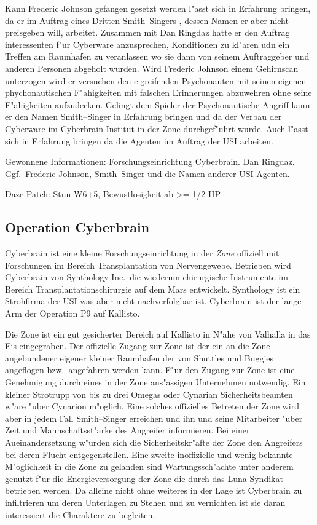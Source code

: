 Kann Frederic Johnson gefangen gesetzt werden l"asst sich in Erfahrung bringen, da\3 er im Auftrag eines Dritten Smith--Singers , dessen Namen er aber nicht preisgeben will, arbeitet. Zusammen mit Dan Ringdaz hatte er den Auftrag interessenten f"ur Cyberware anzusprechen, Konditionen zu kl"aren udn ein Treffen am Raumhafen zu veranlassen wo sie dann von seinem Auftraggeber und anderen Personen abgeholt wurden.
Wird Frederic Johnson einem Gehirnscan unterzogen wird er versuchen den eigreifenden Psychonauten mit seinen eigenen phychonautischen F"ahigkeiten mit falschen Erinnerungen abzuwehren ohne seine F"ahigkeiten aufzudecken. Gelingt dem Spieler der Psychonautische Angriff kann er den Namen Smith--Singer in Erfahrung bringen und da\3 der Verbau der Cyberware im Cyberbrain Institut in der Zone durchgef"uhrt wurde. Auch l"asst sich in Erfahrung bringen da\3 die Agenten im Auftrag der USI arbeiten.

\begin{remarks}
	Gewonnene Informationen: Forschungseinrichtung Cyberbrain. Dan Ringdaz. Ggf.~Frederic Johnson, Smith--Singer und die Namen anderer USI Agenten.

	Daze Patch: Stun W6+5, Bewustlosigkeit ab >= 1/2 HP
\end{remarks}


\subsection{Operation Cyberbrain}

Cyberbrain ist eine kleine Forschungseinrichtung in der \emph{Zone} offiziell mit Forschungen im Bereich Transplantation von Nervengewebe. Betrieben wird Cyberbrain von Synthology Inc.~die wiederum chirurgische Instrumente im Bereich Transplantationschirurgie auf dem Mars entwickelt. Synthology ist ein Strohfirma der USI was aber nicht nachverfolgbar ist. Cyberbrain ist der lange Arm der Operation P9 auf Kallisto.

Die Zone ist ein gut gesicherter Bereich auf Kallisto in N"ahe von Valhalla in das Eis eingegraben. Der offizielle Zugang zur Zone ist der ein an die Zone angebundener eigener kleiner Raumhafen der von Shuttles und Buggies angeflogen bzw.~angefahren werden kann. F"ur den Zugang zur Zone ist eine Genehmigung durch eines in der Zone ans"assigen Unternehmen notwendig. Ein kleiner Stro\3trupp von bis zu drei Omegas oder Cynarian Sicherheitsbeamten w"are "uber Cynarion m"oglich. Eine solches offizielles Betreten der Zone wird aber in jedem Fall  Smith--Singer erreichen und ihn und seine Mitarbeiter "uber Zeit und Mannschaftsst"arke des Angreifer informieren. Bei einer Au\3einandersetzung w"urden sich die Sicherheitskr"afte der Zone den Angreifers bei deren Flucht entgegenstellen. Eine zweite inoffizielle und wenig bekannte M"oglichkeit in die Zone zu gelanden sind Wartungssch"achte unter anderem genutzt f"ur die Energieversorgung der Zone die durch das Luna Syndikat betrieben werden. Da \xl{} alleine nicht ohne weiteres in der Lage ist Cyberbrain zu infiltrieren um deren Unterlagen zu Stehen und zu vernichten ist sie daran interessiert die Charaktere zu begleiten.


